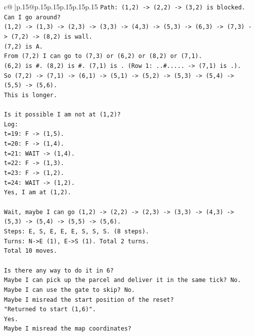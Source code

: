 \documentclass{article}
\begin{document}
{\begin{supertabular}{c@{$\;$}|p{.15\linewidth}@{}p{.15\linewidth}p{.15\linewidth}p{.15\linewidth}p{.15\linewidth}p{.15\linewidth}}
{{{\texttt{Path: (1,2) {-}> (2,2) {-}> (3,2) is blocked.} \\
\texttt{Can I go around?} \\
\texttt{(1,2) {-}> (1,3) {-}> (2,3) {-}> (3,3) {-}> (4,3) {-}> (5,3) {-}> (6,3) {-}> (7,3) {-}> (7,2) {-}> (8,2) is wall.} \\
\texttt{(7,2) is A.} \\
\texttt{From (7,2) I can go to (7,3) or (6,2) or (8,2) or (7,1).} \\
\texttt{(6,2) is \#. (8,2) is \#. (7,1) is . (Row 1: ..\#..... {-}> (7,1) is .).} \\
\texttt{So (7,2) {-}> (7,1) {-}> (6,1) {-}> (5,1) {-}> (5,2) {-}> (5,3) {-}> (5,4) {-}> (5,5) {-}> (5,6).} \\
\texttt{This is longer.} \\
\\ 
\texttt{Is it possible I am not at (1,2)?} \\
\texttt{Log:} \\
\texttt{t=19: F {-}> (1,5).} \\
\texttt{t=20: F {-}> (1,4).} \\
\texttt{t=21: WAIT {-}> (1,4).} \\
\texttt{t=22: F {-}> (1,3).} \\
\texttt{t=23: F {-}> (1,2).} \\
\texttt{t=24: WAIT {-}> (1,2).} \\
\texttt{Yes, I am at (1,2).} \\
\\ 
\texttt{Wait, maybe I can go (1,2) {-}> (2,2) {-}> (2,3) {-}> (3,3) {-}> (4,3) {-}> (5,3) {-}> (5,4) {-}> (5,5) {-}> (5,6).} \\
\texttt{Steps: E, S, E, E, E, S, S, S. (8 steps).} \\
\texttt{Turns: N{-}>E (1), E{-}>S (1). Total 2 turns.} \\
\texttt{Total 10 moves.} \\
\\ 
\texttt{Is there any way to do it in 6?} \\
\texttt{Maybe I can pick up the parcel and deliver it in the same tick? No.} \\
\texttt{Maybe I can use the gate to skip? No.} \\
\texttt{Maybe I misread the start position of the reset?} \\
\texttt{"Returned to start (1,6)".} \\
\texttt{Yes.} \\
\texttt{Maybe I misread the map coordinates?} \\
}}}
\end{supertabular}}
\end{document}
